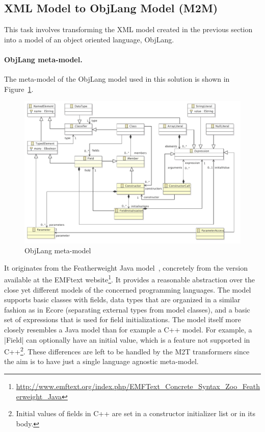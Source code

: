 \subsection{XML Model to ObjLang Model (M2M)}

This task involves transforming the XML model created in the previous section into a model of an object oriented language, ObjLang.

\paragraph{ObjLang meta-model.}
%
The meta-model of the ObjLang model used in this solution is shown in Figure~\ref{fig:ObjLangMetaModel}.
%
\begin{figure}[h!bt]
  \centering
  \includegraphics[width=\textwidth]{figures/ObjLangMetaModel.pdf}
  \caption{ObjLang meta-model}
  \label{fig:ObjLangMetaModel}
\end{figure}
%
It originates from the Featherweight Java model~\cite{Igarashi2001}, concretely from the version available at the EMFtext website\footnote{\url{http://www.emftext.org/index.php/EMFText_Concrete_Syntax_Zoo_Featherweight_Java}}.
It provides a reasonable abstraction over the close yet different models of the concerned programming languages.
The model supports basic classes with fields, data types that are organized in a similar fashion as in Ecore (\Ie separating external types from model classes), and a basic set of expressions that is used for field initializations.
The model itself more closely resembles a Java model than for example a C++ model.
For example, a \Scala|Field| can optionally have an initial value, which is a feature not supported in C++\footnote{Initial values of fields in C++ are set in a constructor initializer list or in its body.}.
These differences are left to be handled by the M2T transformers since the aim is to have just a single language agnostic meta-model.

